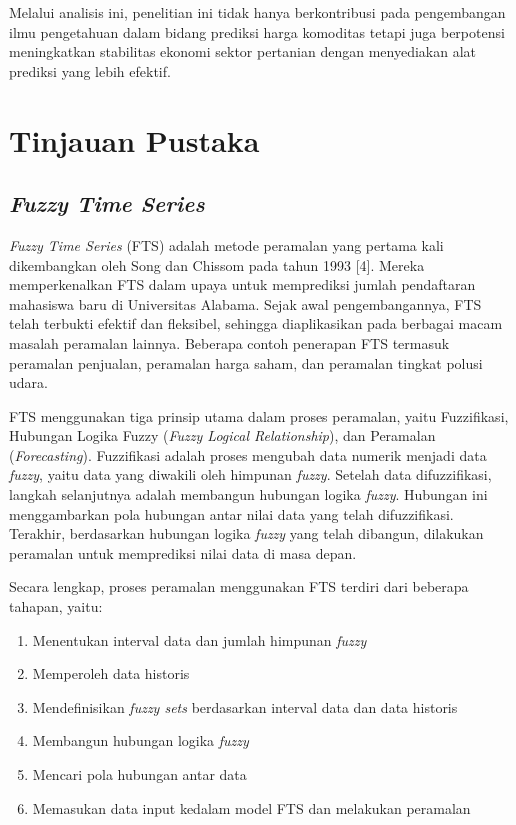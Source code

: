 \documentclass[conference]{IEEEtran}
\begin{document}
Melalui analisis ini, penelitian ini tidak hanya berkontribusi pada pengembangan ilmu pengetahuan dalam bidang prediksi harga komoditas tetapi juga berpotensi meningkatkan stabilitas ekonomi sektor pertanian dengan menyediakan alat prediksi yang lebih efektif.


\section{Tinjauan Pustaka}

\subsection{\textit{Fuzzy Time Series}}
\textit{Fuzzy Time Series} (FTS) adalah metode peramalan yang pertama kali dikembangkan oleh Song dan Chissom pada tahun 1993 [4]. Mereka memperkenalkan FTS dalam upaya untuk memprediksi jumlah pendaftaran mahasiswa baru di Universitas Alabama. Sejak awal pengembangannya, FTS telah terbukti efektif dan fleksibel, sehingga diaplikasikan pada berbagai macam masalah peramalan lainnya. Beberapa contoh penerapan FTS termasuk peramalan penjualan, peramalan harga saham, dan peramalan tingkat polusi udara.

FTS menggunakan tiga prinsip utama dalam proses peramalan, yaitu Fuzzifikasi, Hubungan Logika Fuzzy (\textit{Fuzzy Logical Relationship}), dan Peramalan (\textit{Forecasting}). Fuzzifikasi adalah proses mengubah data numerik menjadi data \textit{fuzzy}, yaitu data yang diwakili oleh himpunan \textit{fuzzy}. Setelah data difuzzifikasi, langkah selanjutnya adalah membangun hubungan logika \textit{fuzzy}. Hubungan ini menggambarkan pola hubungan antar nilai data yang telah difuzzifikasi. Terakhir, berdasarkan hubungan logika \textit{fuzzy} yang telah dibangun, dilakukan peramalan untuk memprediksi nilai data di masa depan.

Secara lengkap, proses peramalan menggunakan FTS terdiri dari beberapa tahapan, yaitu:
\begin{enumerate}
    \item Menentukan interval data dan jumlah himpunan \textit{fuzzy}
    \item Memperoleh data historis
    \item Mendefinisikan \textit{fuzzy sets} berdasarkan interval data dan data historis
    \item Membangun hubungan logika \textit{fuzzy}
    \item Mencari pola hubungan antar data
    \item Memasukan data input kedalam model FTS dan melakukan peramalan
\end{enumerate}
\end{document}
